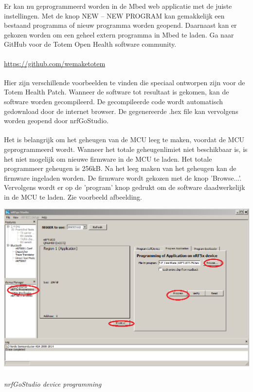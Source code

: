 \documentclass[conference]{IEEEtran}
\begin{document}
Er kan nu geprogrammeerd worden in de Mbed web applicatie met de juiste instellingen. Met de knop NEW -- NEW PROGRAM kan gemakkelijk een bestaand programma of nieuw programma worden geopend. Daarnaast kan er gekozen worden om een geheel extern programma in Mbed te laden. Ga naar GitHub voor de Totem Open Health software community.\\\\\url{https://github.com/wemaketotem}\\\\Hier zijn verschillende voorbeelden te vinden die speciaal ontworpen zijn voor de Totem Health Patch. Wanneer de software tot resultaat is gekomen, kan de software worden gecompileerd. De gecompileerde code wordt automatisch gedownload door de internet browser. De gegenereerde .hex file kan vervolgens worden geopend door nrfGoStudio.\\\\Het is belangrijk om het geheugen van de MCU leeg te maken, voordat de MCU geprogrammeerd wordt. Wanneer het totale geheugenlimiet niet beschikbaar is, is het niet mogelijk om nieuwe firmware in de MCU te laden. Het totale programmeer geheugen is 256kB. Na het leeg maken van het geheugen kan de firmware ingeladen worden. De firmware wordt gekozen met de knop 'Browse...'. Vervolgens wordt er op de 'program' knop gedrukt om de software daadwerkelijk in de MCU te laden. Zie voorbeeld afbeelding.

\begin{center}
    \includegraphics[scale=0.4]{gostudio}
    \begin{minipage}{0.6\textwidth}
    \footnotesize
    \emph{nrfGoStudio device programming}
    \end{minipage}
\end{center}
\end{document}
